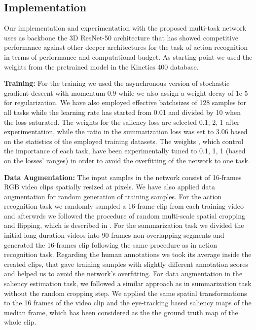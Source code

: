 \documentclass[10pt,twocolumn,letterpaper]{article}
\begin{document}
\subsection{Implementation}

Our implementation and experimentation with the proposed multi-task network uses as backbone the 3D ResNet-50 architecture \cite{hara2018can} that has showed competitive performance against other deeper architectures for the task of action recognition in terms of performance and computational budget. As starting point we used the weights from the pretrained model in the Kinetics 400 database. 

\noindent \textbf{Training:} For the training we used the asynchronous version of stochastic gradient descent with momentum 0.9 while we also assign a weight decay of 1e-5 for regularization. We have also employed effective batchsizes of 128 samples for all tasks while the learning rate has started from 0.01 and divided by 10 when the loss saturated. 
The weights  for the saliency loss are selected 0.1, 2, 1 after experimentation, while the ratio  in the summarization loss was set to 3.06 based on the statistics of the employed training datasets. The weights , which control the importance of each task, have been experimentally tuned to 0.1, 1, 1 (based on the losses' ranges) in order to avoid the overfitting of the network to one task.

\noindent \textbf{Data Augmentation:} The input samples in the network consist of 16-frames RGB video clips spatially resized at  pixels. We have also applied data augmentation for random generation of training samples. For the action recognition task we randomly sampled a 16-frame clip from each training video and afterwrds we followed the procedure of random multi-scale spatial cropping and flipping, which is described in \cite{wang2016temporal}. For the summarization task we divided the initial long-duration videos into 90-frames non-overlapping segments and generated the 16-frames clip following the same procedure as in action recognition task. Regarding the human annotations we took its average inside the created clips, that gave training samples with slightly different annotation scores and helped us to avoid the network's overfitting.    For data augmentation in the saliency estimation task, we followed a similar approach as in summarization task without the random cropping step. We applied the same spatial transformations to the 16 frames of the video clip and the eye-tracking based saliency maps of the median frame, which has been considered as the the ground truth map of the whole clip.
\end{document}
